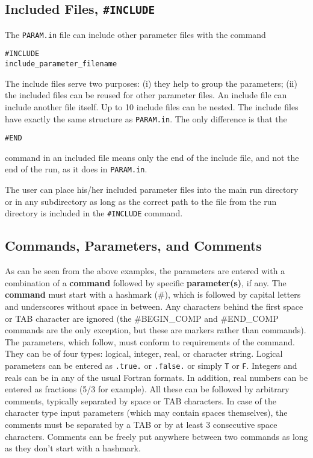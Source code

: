 \subsection{Included Files, {\tt \#INCLUDE} \label{section:include}}

The {\tt PARAM.in} file can include other parameter files with the 
command
\begin{verbatim}
#INCLUDE
include_parameter_filename
\end{verbatim}
The include files serve two purposes: (i) they help
to group the parameters; (ii) the included files can be reused
for other parameter files. 
An include file can include another file itself.
Up to 10 include files can be nested.
The include files have exactly the same structure as {\tt PARAM.in}. 
The only difference is that the
\begin{verbatim}
#END
\end{verbatim}
command in an included file means only the end of the include file, 
and not the end of the run, as it does in {\tt PARAM.in}.

The user can place his/her
included parameter files into the main run directory or in any subdirectory
as long as the correct path to the file from the run directory is
included in the {\tt \#INCLUDE} command.

\subsection{Commands, Parameters, and Comments \label{section:commands}}

As can be seen from the above examples, the parameters are entered
with a combination of a {\bf command} followed by specific {\bf parameter(s)},
if any.
The {\bf command} must start with a hashmark (\#), which 
is followed by capital letters and underscores without space in between. 
Any characters behind the first space or TAB character are ignored
(the \#BEGIN\_COMP and \#END\_COMP commands are the only exception,
but these are markers rather than commands).
The parameters, which follow, must conform to 
requirements of the command. They can be of four types: logical, integer,
real, or character string. Logical parameters can be entered as 
{\tt .true.} or {\tt .false.} or simply {\tt T} or {\tt F}.
Integers and reals can be in any of the usual Fortran formats.  In
addition, real numbers can be entered as fractions (5/3 for example).
All these can be followed by arbitrary comments, typically separated
by space or TAB characters. In case of the character type input
parameters (which may contain spaces themselves), the comments must
be separated by a TAB or by at least 3 consecutive space characters.
Comments can be freely put anywhere between two commands as long
as they don't start with a hashmark.

